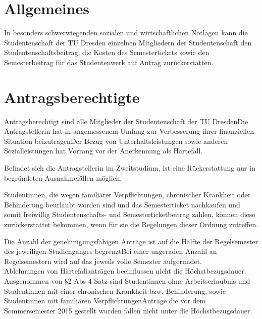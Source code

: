 \setcounter{section}{0}
\begin{multicols}{2}



\section{Allgemeines}
\Abs \Satz In besonders schwerwiegenden sozialen und wirtschaftlichen Notlagen kann die Studentenschaft der TU Dresden einzelnen Mitgliedern der Studentenschaft den Studentenschaftsbeitrag, die Kosten des Semestertickets sowie den Semesterbeitrag für das Studentenwerk auf Antrag zurückerstatten. 


\section{Antragsberechtigte}
\Abs \Satz Antragsberechtigt sind alle Mitglieder der Studentenschaft der TU Dresden\. Die Antragstellerin hat in angemessenem Umfang zur Verbesserung ihrer finanziellen Situation beizutragen\. Der Bezug von Unterhaltsleistungen sowie anderen Sozialleistungen hat Vorrang vor der Anerkennung als Härtefall.

\Abs \Satz Befindet sich die Antragstellerin im Zweitstudium, ist eine Rückerstattung nur in begründeten Ausnahmefällen möglich.

\Abs \Satz Studentinnen, die wegen familiärer Verpflichtungen, chronischer Krankheit oder Behinderung beurlaubt worden sind und das Semesterticket nachkaufen und somit freiwillig Studentenschafts- und Semesterticketbeitrag zahlen, können diese zurückerstattet bekommen, wenn für sie die Regelungen dieser Ordnung zutreffen.

\Abs \Satz Die Anzahl der genehmigungsfähigen Anträge ist auf die Hälfte der Regelsemester des jeweiligen Studienganges begrenzt\. Bei einer ungeraden Anzahl an Regelsemestern wird auf das jeweils volle Semester aufgerundet.\\
\Satz Ablehnungen von Härtefallanträgen beeinflussen nicht die Höchstbezugsdauer.\\
\Satz Ausgenommen von §2 Abs 4 Satz sind Studentinnen ohne Arbeitserlaubnis und Studentinnen mit einer chronischen Krankheit bzw. Behinderung, sowie Studentinnen mit familiären Verpflichtungen\. 
Anträge die vor dem Sommersemester 2015 gestellt wurden fallen nicht unter die Höchstbezugsdauer.



\end{multicols}
